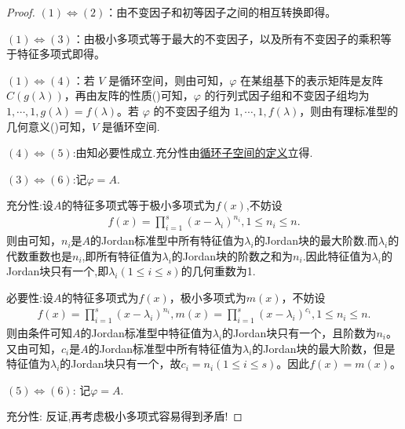 \documentclass[../../main.tex]{subfiles}
\begin{document}
\begin{proof}
\((1)\Leftrightarrow(2)\)：由不变因子和初等因子之间的相互转换即得。

\((1)\Leftrightarrow(3)\)：由极小多项式等于最大的不变因子，以及所有不变因子的乘积等于特征多项式即得。 

\((1)\Leftrightarrow(4)\)：若 \(V\) 是循环空间，则由可知，\(\varphi\) 在某组基下的表示矩阵是友阵 \(C(g(\lambda))\)，再由友阵的性质()可知，\(\varphi\) 的行列式因子组和不变因子组均为 \(1,\cdots,1,g(\lambda)=f(\lambda)\)。若 \(\varphi\) 的不变因子组为 \(1,\cdots,1,f(\lambda)\)，则由有理标准型的几何意义()可知，\(V\) 是循环空间.

\((4)\Leftrightarrow(5)\):由知必要性成立.充分性由\hyperref[definition:循环子空间和循环空间]{循环子空间的定义}立得.

\((3)\Leftrightarrow(6)\):记$\varphi=A$.

{\heiti 充分性:}设$A$的特征多项式等于极小多项式为$f\left( x \right)$,不妨设
\begin{align*}
f\left( x \right) =\prod_{i=1}^s{\left( x-\lambda _i \right) ^{n_i}},1\leqslant n_i\leqslant n.
\end{align*}
则由可知，$n_i$是$A$的Jordan标准型中所有特征值为$\lambda _i$的Jordan块的最大阶数.而$\lambda_i$的代数重数也是$n_i$,即所有特征值为$\lambda_i$的Jordan块的阶数之和为$n_i$.因此特征值为$\lambda_i$的Jordan块只有一个,即$\lambda_i(1\leqslant i\leqslant s)$的几何重数为1.

{\heiti 必要性:}设$A$的特征多项式为$f\left( x \right)$，极小多项式为$m\left( x \right)$，不妨设
\begin{align*}
f\left( x \right) =\prod_{i=1}^s{\left( x-\lambda _i \right) ^{n_i}},m\left( x \right) =\prod_{i=1}^s{\left( x-\lambda _i \right) ^{c_i}},1\leqslant n_i\leqslant n.
\end{align*}
则由条件可知$A$的Jordan标准型中特征值为$\lambda _i$的Jordan块只有一个，且阶数为$n_i$。又由可知，$c_i$是$A$的Jordan标准型中所有特征值为$\lambda _i$的Jordan块的最大阶数，但是特征值为$\lambda _i$的Jordan块只有一个，故$c_i=n_i\left( 1\leqslant i\leqslant s \right)$。因此$f\left( x \right) =m\left( x \right)$。

\((5)\Leftrightarrow(6)\):
记$\varphi=A$.

{\heiti 充分性:} 反证,再考虑极小多项式容易得到矛盾!


\end{proof}
\end{document}
